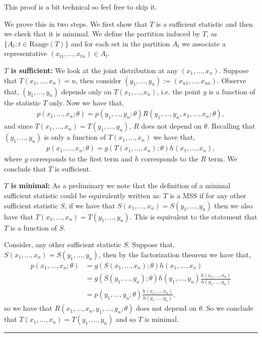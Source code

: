\documentclass[twoside,12pt]{article}
\newenvironment{proof}{{\bf Proof:}}{\hfill\rule{2mm}{2mm}}
\begin{document}
\begin{proof}
This proof is a bit technical so feel free to skip it.



We prove this in two steps. We first show that $T$ is a sufficient statistic and then we check that it is minimal. We define the partition induced by $T$, as $\{A_t: t \in \text{Range}(T)\}$ and for each set in the partition $A_t$ we associate a representative $(x_{t1},\ldots,x_{tn}) \in A_t$.

{\bf $T$ is sufficient: } We look at the joint distribution at any $(x_1,\ldots,x_n)$. Suppose that $T(x_1,\ldots,x_n) = u$, then consider $(y_1,\ldots,y_n) := (x_{u1},\ldots,x_{un}).$ Observe that, $(y_1,\ldots,y_n)$ depends only on $T(x_1,\ldots,x_n)$, i.e. the point $y$ is a function of the statistic $T$ only. Now we have that,
\begin{align*}
p(x_1,\ldots,x_n; \theta) = p(y_1,\ldots,y_n; \theta) R(y_1,\ldots,y_n,x_1,\ldots,x_n; \theta),
\end{align*}
and since $T(x_1,\ldots,x_n) = T(y_1,\ldots,y_n)$, $R$ does not depend on $\theta$. Recalling that $(y_1,\ldots,y_n)$ is only a function of $T(x_1,\ldots,x_n)$ we have that,
\begin{align*}
p(x_1,\ldots,x_n; \theta) = g(T(x_1,\ldots,x_n);\theta) h(x_1,\ldots,x_n),
\end{align*}
where $g$ corresponds to the first term and $h$ corresponds to the $R$ term. We conclude that $T$ is sufficient.

{\bf $T$ is minimal: } As a preliminary we note that the definition of a minimal sufficient statistic could be equivalently written as: $T$ is a MSS if for any other sufficient statistic $S$, if we have that $S(x_1,\ldots,x_n) = S(y_1,\ldots,y_n)$ then we also have that $T(x_1,\ldots,x_n) = T(y_1,\ldots,y_n)$. This is equivalent to the statement that $T$ is a function of $S$.

Consider, any other sufficient statistic $S$. Suppose that, $S(x_1,\ldots,x_n) = S(y_1,\ldots,y_n)$, then by the factorization theorem we have that,
\begin{align*}
p(x_1,\ldots,x_n; \theta) &= g(S(x_1,\ldots,x_n);\theta) h(x_1,\ldots,x_n) \\
&=  g(S(y_1,\ldots,y_n);\theta) h(y_1,\ldots,y_n) \frac{h(x_1,\ldots,x_n)}{h(y_1,\ldots,y_n)} \\
&= p(y_1,\ldots,y_n; \theta) \frac{h(x_1,\ldots,x_n)}{h(y_1,\ldots,y_n)},
\end{align*}
so we have that $R(x_1,\ldots,x_n,y_1,\ldots,y_n; \theta)$ does not depend on $\theta$. So we conclude that $T(x_1,\ldots,x_n) = T(y_1,\ldots,y_n)$ and so $T$ is minimal.
\end{proof}
\end{document}
